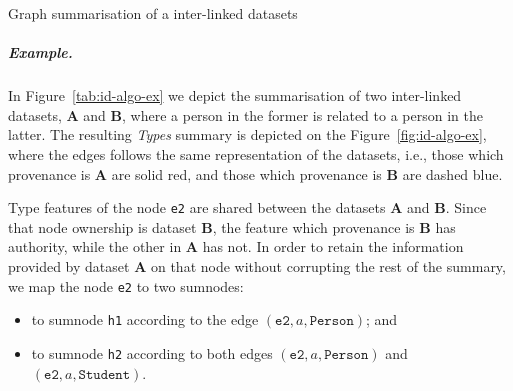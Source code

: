 \begin{algorithm}
	\DontPrintSemicolon
	\BlankLine
	\caption{Graph summarisation of a inter-linked datasets}
	\label{alg:id-summary}
\end{algorithm}

\subparagraph{Example.}

In Figure~\ref{tab:id-algo-ex} we depict the summarisation of two inter-linked datasets, \textbf{A} and \textbf{B}, where a person in the former is related to a person in the latter. The resulting \emph{Types} summary is depicted on the Figure~\ref{fig:id-algo-ex}, where the edges follows the same representation of the datasets, i.e., those which provenance is \textbf{A} are solid red, and those which provenance is \textbf{B} are dashed blue.

Type features of the node \texttt{e2} are shared between the datasets \textbf{A} and \textbf{B}. Since that node ownership is dataset \textbf{B}, the feature which provenance is \textbf{B} has authority, while the other in \textbf{A} has not. In order to retain the information provided by dataset \textbf{A} on that node without corrupting the rest of the summary, we map the node \texttt{e2} to two sumnodes:
\begin{itemize}[topsep=0pt,itemsep=-1ex,partopsep=1ex,parsep=1ex]
\item to sumnode \texttt{h1} according to the edge $(\texttt{e2}, a, \texttt{Person})$; and
\item to sumnode \texttt{h2} according to both edges $(\texttt{e2}, a, \texttt{Person})$ and $(\texttt{e2}, a, \texttt{Student})$.
\end{itemize}

